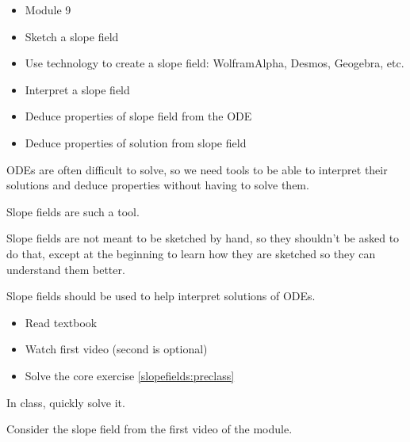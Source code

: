 \begin{lesson}

	\begin{itemize}
		\item Module 9
	\end{itemize}

	\begin{itemize}
		\item Sketch a slope field
		\item Use technology to create a slope field: WolframAlpha, Desmos, Geogebra, etc.
		\item Interpret a slope field
		\item Deduce properties of slope field from the ODE
		\item Deduce properties of solution from slope field
	\end{itemize}
	

ODEs are often difficult to solve, so we need tools to be able to interpret their solutions and deduce properties without having to solve them.

Slope fields are such a tool. 

Slope fields are not meant to be sketched by hand, so they shouldn't be asked to do that, except at the beginning to learn how they are sketched so they can understand them better. 

Slope fields should be used to help interpret solutions of ODEs.



\begin{itemize}
	\item Read textbook
	\item Watch first video (second is optional)
	\item Solve the core exercise \ref{slopefields:preclass}
\end{itemize}
 
\end{lesson}








\begin{annotation}
\begin{goals}
	
	In class, quickly solve it.
\end{goals}	
\end{annotation}
\question \label{slopefields:preclass}
	Consider the slope field from the first video of the module.
	
